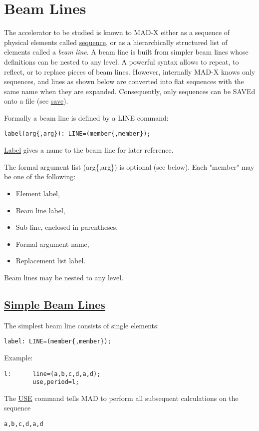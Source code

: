 

\chapter{Beam Lines}
\label{chap:lines}

The accelerator to be studied is known to MAD-X either as a sequence of
physical elements called \href{sequence.html}{sequence}, or as a
hierarchically structured list of elements called a \emph{beam line}. A
beam line is built from simpler beam lines whose definitions can be
nested to any level. A powerful syntax allows to repeat, to reflect, or
to replace pieces of beam lines. However, internally MAD-X knows only
sequences, and lines as shown below are converted into flat sequences
with the same name when they are expanded. Consequently, only sequences
can be SAVEd onto a file (see
\href{../control/general.html#save}{save}).  

Formally a beam line is defined by a LINE command: 
\begin{verbatim}
label(arg{,arg}): LINE=(member{,member});
\end{verbatim}
\href{label.html}{Label} gives a name to the beam line for later reference. 

The formal argument list (arg\{,arg\}) is optional (see below). Each
"member" may be one of the following:  
\begin{itemize}
	\item  Element label, 
	\item  Beam line label, 
	\item  Sub-line, enclosed in parentheses, 
	\item  Formal argument name, 
	\item  Replacement list label. 
\end{itemize} 
Beam lines may be nested to any level.  

\section{\href{simple}{Simple Beam Lines}} 
The simplest beam line consists of single elements: 
\begin{verbatim}
label: LINE=(member{,member});
\end{verbatim} 
Example: 
\begin{verbatim}
l:      line=(a,b,c,d,a,d);
        use,period=l;
\end{verbatim} 
The \href{../control/general.html#use}{USE} command tells MAD to perform
all subsequent calculations on the sequence  
\begin{verbatim}
a,b,c,d,a,d
\end{verbatim}

